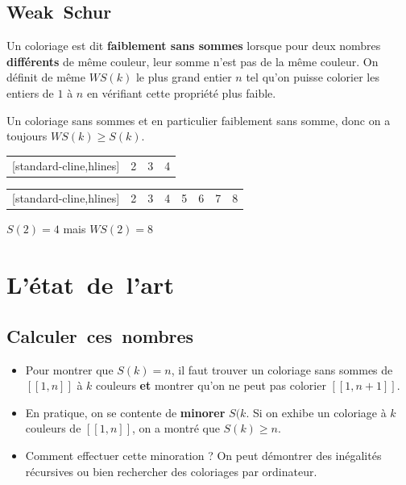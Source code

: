 \documentclass[graphics]{beamer}
\begin{document}
\subsection{Weak~Schur}

\begin{frame}
	\begin{tcolorbox}[colback=red!5,colframe=red!40!black,title=Définition]
		Un coloriage est dit \textbf{faiblement sans sommes} lorsque pour deux nombres \textbf{différents} de même couleur,
		leur somme n'est pas de la même couleur. On définit de même \(WS(k)\) le plus grand entier \(n\) tel qu'on puisse colorier les entiers de
		\(1\) à \(n\) en vérifiant cette propriété plus faible.
	\end{tcolorbox}
	\pause
	Un coloriage sans sommes et en particulier faiblement sans somme, donc on a toujours \(WS(k) \geq S(k)\).\\
	\pause 
	\begin{center}
	\begin{NiceTabular}{|*{4}{c|}}[standard-cline,hlines]
		\CodeBefore
		 & 2 & 3 & 4 \\
	\end{NiceTabular}

	\begin{NiceTabular}{|*{8}{c|}}[standard-cline,hlines]
		\CodeBefore
		 & 2 & 3 & 4 & 5 & 6 & 7 & 8 \\
	\end{NiceTabular}
	\end{center}
	\(S(2) = 4\) mais \(WS(2) = 8\)
\end{frame}

\section{L'état~de~l'art}
\subsection{Calculer~ces~nombres}

\begin{frame}
	\begin{itemize}
	\item Pour montrer que \(S(k) = n\), il faut trouver un coloriage sans sommes de \([\![1,n]\!]\) à \(k\) couleurs
	\textbf{et} montrer qu'on ne peut pas colorier \([\![1,n+1]\!]\). 
	\pause
	\item En pratique, on se contente de \textbf{minorer} \(S(k\). Si on exhibe un coloriage à \(k\) couleurs de 
	\([\![1,n]\!]\), on a montré que \(S(k) \geq n\). 
	\pause
	\item Comment effectuer cette minoration ? On peut démontrer des inégalités récursives ou bien rechercher des coloriages
	par ordinateur.
	\end{itemize}
\end{frame}
\end{document}
